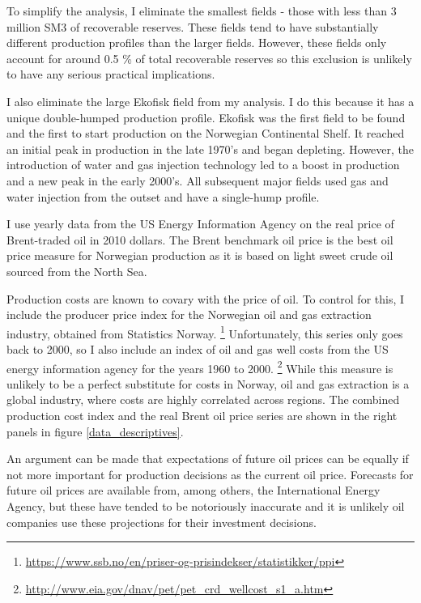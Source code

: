 \documentclass[11pt]{article}
\begin{document}
To simplify the analysis, I eliminate the smallest fields - those with less than 3 million SM3 of recoverable reserves.  These fields tend to have substantially different production profiles than the larger fields. However, these fields only account for around 0.5 \% of total recoverable reserves so this exclusion is unlikely to have any serious practical implications. 

I also eliminate the large Ekofisk field from my analysis.  I do this because it has a unique double-humped production profile. Ekofisk was the first field to be found and the first to start production on the Norwegian Continental Shelf.  It reached an initial peak in production in the late 1970's and began depleting. However, the introduction of water and gas injection technology led to a boost in production and a new peak in the early 2000's. All subsequent major fields used gas and water injection from the outset and have a single-hump profile.  

I use yearly data from the US Energy Information Agency on the real price of Brent-traded oil in 2010 dollars. The Brent benchmark oil price is the best oil price measure for Norwegian production as it is based on light sweet crude oil sourced from the North Sea.  

Production costs are known to covary with the price of oil.  To control for this, I include the producer price index for the Norwegian oil and gas extraction industry, obtained from Statistics Norway. \footnote{\url{https://www.ssb.no/en/priser-og-prisindekser/statistikker/ppi}} Unfortunately, this series only goes back to 2000, so I also include an index of oil and gas well costs from the US energy information agency for the years 1960 to 2000.  \footnote{\url{http://www.eia.gov/dnav/pet/pet_crd_wellcost_s1_a.htm}} While this measure is unlikely to be a perfect substitute for costs in Norway, oil and gas extraction is a global industry, where costs are highly correlated across regions. The combined production cost index and the real Brent oil price series are shown in the right panels in figure \ref{data_descriptives}.

An argument can be made that expectations of future oil prices can be equally if not more important for production decisions as the current oil price.  Forecasts for future oil prices are available from, among others, the International Energy Agency, but these have tended to be notoriously inaccurate and it is unlikely oil companies use these projections for their investment decisions.
\end{document}
